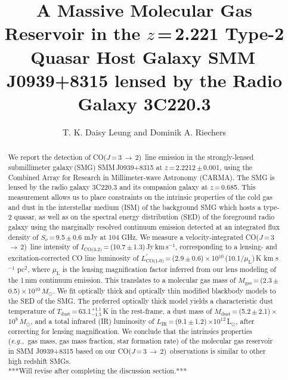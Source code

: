 \documentclass[twocolumn,apj,numberedappendix]{emulateapj}
\newcommand{\Msun}{\mbox{$M_{\odot}$}}
\newcommand{\Lsun}{\mbox{L$_{\odot}$}}
\newcommand{\CO}{\mbox{CO($J$\,=\,3\,$\rightarrow$\,2) }}
\newcommand{\Lp}{\mbox{$L^{\prime}_\textrm{CO(1-0)}$}}
\newcommand{\LpU}{\mbox{K\,\,km\,\,s$^{-1}$\,\,pc$^2$}}
\newcommand{\eg}{{\sl e.g.,~}}
\newcommand{\pmOne}{\mbox{$^{-1}$}}
\begin{document}
\title{A Massive Molecular Gas Reservoir in the $z$\,=\,2.221 Type-2 Quasar Host Galaxy SMM\,J0939+8315 lensed by the Radio Galaxy 3C220.3}
\author{T. K. Daisy Leung and Dominik A. Riechers}

\begin{abstract}
We report the detection of \CO line emission in the strongly-lensed submillimeter galaxy\,(SMG) SMM\,J0939+8315 at $z$\,=\,2.2212\,$\pm$\,0.001, using  
the Combined Array for Research in Millimeter-wave Astronomy (CARMA). 
The SMG is lensed by the radio galaxy 3C220.3 and its companion galaxy at $z$\,=\,0.685. 
This measurement allows us to place constraints on the intrinsic properties
of the cold gas and dust in the interstellar medium (ISM) of the background SMG which hosts a type-2 quasar, as well as on the spectral energy distribution (SED) of the foreground radio galaxy using the marginally resolved continuum 
emission detected at an integrated flux density of $S_\nu$\,=\,9.5\,$\pm$\,0.6 mJy
 at 104 GHz.
We measure a velocity-integrated \CO line intensity of $I_\textrm{CO(3-2)}$\,=\,(10.7\,$\pm$\,1.3)\,Jy\,km\,s\pmOne,
corresponding to a lensing- and excitation-corrected CO line luminosity of \Lp\,=\,(2.9\,$\pm$\,0.6)\,$\times$\,10$^{10}$\,(10.1/$\mu_\textrm{L}$)\,\LpU, where $\mu_\textrm{L}$ is the lensing magnification factor inferred from our lens modeling of the 1\,mm continuum emission. 
 This
translates to a molecular gas mass of $M_\textrm{gas}$\,=\,(2.3\,$\pm$\,0.5)\,$\times$\,10$^{10}$\,\Msun. We 
fit optically thick and optically thin modified blackbody models to the SED of the SMG. The preferred optically thick model yields a characteristic dust temperature of $T_\textrm{dust}$\,=\,63.1$^{+1.1}_{-1.3}$\,K in the rest-frame, a dust mass of $M_\textrm{dust}$\,=\,(5.2\,$\pm$\,2.1)\,$\times$\,10$^8$\,\Msun, and a total infrared (IR) luminosity of $L_\textrm{IR}$\,=\,(9.1\,$\pm$\,1.2)\,$\times$10$^{12}$\,\Lsun, after correcting for lensing magnification. We conclude that the intrinsics properties (\eg gas mass, gas mass 
fraction, star formation rate) of the molecular gas reservoir in SMM
J0939+8315 based on our \CO observations is similar to other high redshift
SMGs. \\
***Will revise after completing the discussion section.***
\end{abstract}
\end{document}
